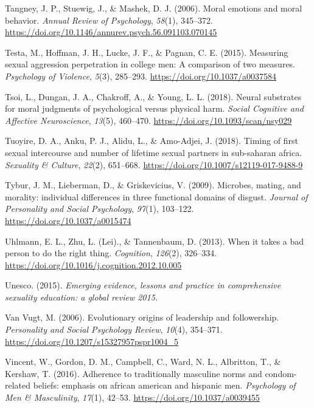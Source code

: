 \documentclass[
  donotrepeattitle,doc, 12pt, a4paper,floatsintext]{apa7}
\newlength{\cslhangindent}
\newlength{\cslentryspacingunit} %
\newenvironment{CSLReferences}[2] %
 {%
  \setlength{\parindent}{0pt}
  \ifodd #1
  \let\oldpar\par
  \def\par{\hangindent=\cslhangindent\oldpar}
  \fi
  \setlength{\parskip}{#2\cslentryspacingunit}
 }%
 {}
\begin{document}
\begin{CSLReferences}{1}{0}
\leavevmode{}%
Tangney, J. P., Stuewig, J., \& Mashek, D. J. (2006). Moral emotions and moral behavior. \emph{Annual Review of Psychology}, \emph{58}(1), 345--372. \url{https://doi.org/10.1146/annurev.psych.56.091103.070145}

\leavevmode{}%
Testa, M., Hoffman, J. H., Lucke, J. F., \& Pagnan, C. E. (2015). Measuring sexual aggression perpetration in college men: A comparison of two measures. \emph{Psychology of Violence}, \emph{5}(3), 285--293. \url{https://doi.org/10.1037/a0037584}

\leavevmode{}%
Tsoi, L., Dungan, J. A., Chakroff, A., \& Young, L. L. (2018). Neural substrates for moral judgments of psychological versus physical harm. \emph{Social Cognitive and Affective Neuroscience}, \emph{13}(5), 460--470. \url{https://doi.org/10.1093/scan/nsy029}

\leavevmode{}%
Tuoyire, D. A., Anku, P. J., Alidu, L., \& Amo-Adjei, J. (2018). Timing of first sexual intercourse and number of lifetime sexual partners in sub-saharan africa. \emph{Sexuality \& Culture}, \emph{22}(2), 651--668. \url{https://doi.org/10.1007/s12119-017-9488-9}

\leavevmode{}%
Tybur, J. M., Lieberman, D., \& Griskevicius, V. (2009). Microbes, mating, and morality: individual differences in three functional domains of disgust. \emph{Journal of Personality and Social Psychology}, \emph{97}(1), 103--122. \url{https://doi.org/10.1037/a0015474}

\leavevmode{}%
Uhlmann, E. L., Zhu, L. (Lei)., \& Tannenbaum, D. (2013). When it takes a bad person to do the right thing. \emph{Cognition}, \emph{126}(2), 326--334. \url{https://doi.org/10.1016/j.cognition.2012.10.005}

\leavevmode{}%
Unesco. (2015). \emph{Emerging evidence, lessons and practice in comprehensive sexuality education: a global review 2015.}

\leavevmode{}%
Van Vugt, M. (2006). Evolutionary origins of leadership and followership. \emph{Personality and Social Psychology Review}, \emph{10}(4), 354--371. \url{https://doi.org/10.1207/s15327957pspr1004_5}

\leavevmode{}%
Vincent, W., Gordon, D. M., Campbell, C., Ward, N. L., Albritton, T., \& Kershaw, T. (2016). Adherence to traditionally masculine norms and condom-related beliefs: emphasis on african american and hispanic men. \emph{Psychology of Men \& Masculinity}, \emph{17}(1), 42--53. \url{https://doi.org/10.1037/a0039455}


\end{CSLReferences}
\end{document}
